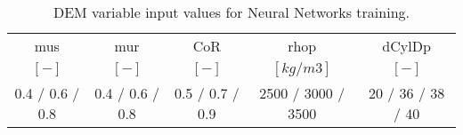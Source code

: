 \begin{table}[h]
\centering
\begin{tabular}{ccccc}
\hline
    \acs{mus} & \acs{mur} & \acs{CoR} & \acs{rhop} & \acs{dCylDp} \\
    	$[-]$  & $[-]$   & $[-]$   & $[kg/m3]$ & $[-]$ \\
    \hline
    0.4 / 0.6 / 0.8 & 0.4 / 0.6 / 0.8 & 0.5 / 0.7 / 0.9 & 2500 / 3000 / 3500 & 20 / 36 / 38 / 40 \\

\hline
\end{tabular}
\caption[DEM variable input values]{DEM variable input values for Neural
Networks training.}
\label{tab:10DEMVariableinputvalues}
\end{table}